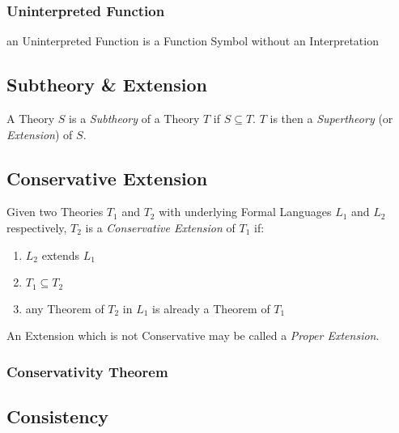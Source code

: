 \subsubsection{Uninterpreted Function}
\label{sec:uninterpreted_function}

an Uninterpreted Function is a Function Symbol without an
Interpretation



\subsection{Subtheory \& Extension}\label{sec:subtheory}

A Theory $S$ is a \emph{Subtheory} of a Theory $T$ if $S \subseteq T$.
$T$ is then a \emph{Supertheory} (or \emph{Extension}) of $S$.



\subsection{Conservative Extension}\label{sec:conservative_extension}

Given two Theories $T_1$ and $T_2$ with underlying Formal Languages
$L_1$ and $L_2$ respectively, $T_2$ is a \emph{Conservative Extension}
of $T_1$ if:
\begin{enumerate}
  \item $L_2$ extends $L_1$
  \item $T_1 \subseteq T_2$
  \item any Theorem of $T_2$ in $L_1$ is already a Theorem of $T_1$
\end{enumerate}
An Extension which is not Conservative may be called a \emph{Proper
  Extension}.



\subsubsection{Conservativity Theorem}\label{sec:conservativity_theorem}



\subsection{Consistency}\label{sec:consistency}

